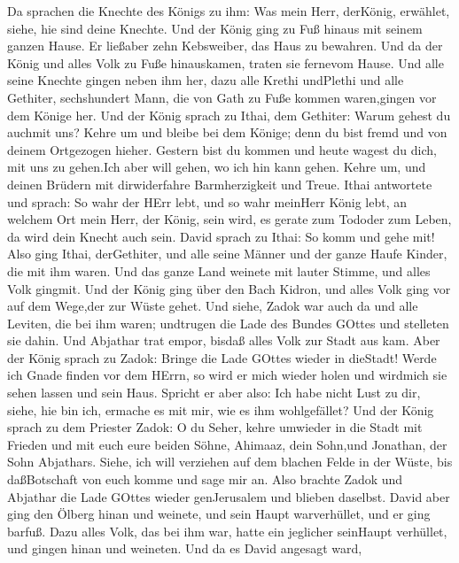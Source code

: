 Da sprachen die Knechte des Königs zu ihm: Was mein Herr, derKönig,
erwählet, siehe, hie sind deine Knechte.  Und der König
ging zu Fuß hinaus mit seinem ganzen Hause. Er ließaber zehn Kebsweiber,
das Haus zu bewahren.  Und da der König und alles Volk zu
Fuße hinauskamen, traten sie fernevom Hause.  Und alle
seine Knechte gingen neben ihm her, dazu alle Krethi undPlethi und alle
Gethiter, sechshundert Mann, die von Gath zu Fuße kommen waren,gingen
vor dem Könige her.  Und der König sprach zu Ithai, dem
Gethiter: Warum gehest du auchmit uns? Kehre um und bleibe bei dem
Könige; denn du bist fremd und von deinem Ortgezogen hieher.
 Gestern bist du kommen und heute wagest du dich, mit uns
zu gehen.Ich aber will gehen, wo ich hin kann gehen. Kehre um, und
deinen Brüdern mit dirwiderfahre Barmherzigkeit und Treue. 
Ithai antwortete und sprach: So wahr der HErr lebt, und so wahr meinHerr
König lebt, an welchem Ort mein Herr, der König, sein wird, es gerate
zum Tododer zum Leben, da wird dein Knecht auch sein. 
David sprach zu Ithai: So komm und gehe mit! Also ging Ithai,
derGethiter, und alle seine Männer und der ganze Haufe Kinder, die mit
ihm waren.  Und das ganze Land weinete mit lauter Stimme,
und alles Volk gingmit. Und der König ging über den Bach Kidron, und
alles Volk ging vor auf dem Wege,der zur Wüste gehet.  Und
siehe, Zadok war auch da und alle Leviten, die bei ihm waren; undtrugen
die Lade des Bundes GOttes und stelleten sie dahin. Und Abjathar trat
empor, bisdaß alles Volk zur Stadt aus kam.  Aber der König
sprach zu Zadok: Bringe die Lade GOttes wieder in dieStadt! Werde ich
Gnade finden vor dem HErrn, so wird er mich wieder holen und wirdmich
sie sehen lassen und sein Haus.  Spricht er aber also: Ich
habe nicht Lust zu dir, siehe, hie bin ich, ermache es mit mir, wie es
ihm wohlgefället?  Und der König sprach zu dem Priester
Zadok: O du Seher, kehre umwieder in die Stadt mit Frieden und mit euch
eure beiden Söhne, Ahimaaz, dein Sohn,und Jonathan, der Sohn Abjathars.
 Siehe, ich will verziehen auf dem blachen Felde in der
Wüste, bis daßBotschaft von euch komme und sage mir an. 
Also brachte Zadok und Abjathar die Lade GOttes wieder genJerusalem und
blieben daselbst.  David aber ging den Ölberg hinan und
weinete, und sein Haupt warverhüllet, und er ging barfuß. Dazu alles
Volk, das bei ihm war, hatte ein jeglicher seinHaupt verhüllet, und
gingen hinan und weineten.  Und da es David angesagt ward,
